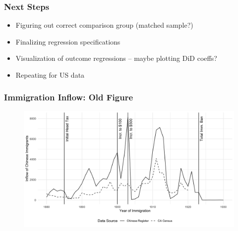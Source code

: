 \documentclass[pdf]{beamer}
\begin{document}
\begin{frame}
    \frametitle{Next Steps}
    \centering
    \begin{itemize}
        \item Figuring out correct comparison group (matched sample?)
        \item Finalizing regression specifications
        \item Visualization of outcome regressions -- maybe plotting DiD coeffs?
        \item Repeating for US data 
    \end{itemize}
\end{frame}
\appendix


\begin{frame}[label = fig2_flow_old]
	\frametitle{Immigration Inflow: Old Figure}
    \centering
	\begin{figure}[H]
		\begin{center}
			\includegraphics[width=\textwidth]{../../figs/shortpaper_figs/fig2_flow.png}
		\end{center}
	\end{figure}
    \hyperlink{fig2_flow}{}
\end{frame}

\end{document}
